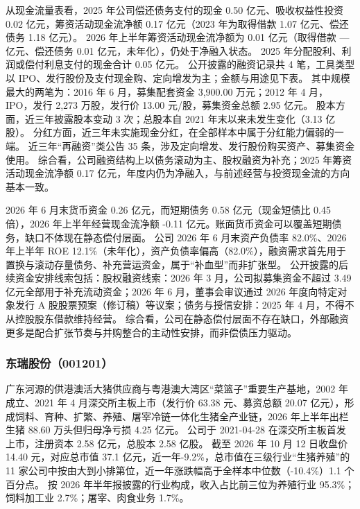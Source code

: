  从现金流量表看，2025 年公司偿还债务支付的现金 0.50 亿元、吸收权益性投资 0.02 亿元，筹资活动现金流净额 0.17 亿元（2023 年为取得借款 1.07 亿元、偿还债务 1.18 亿元）。 2026 年上半年筹资活动现金流净额为 0.01 亿元（取得借款 — 亿元、偿还债务 0.01 亿元，未年化），仍处于净融入状态。 2025 年分配股利、利润或偿付利息支付的现金合计 0.05 亿元。 公开披露的融资记录共 4 笔，工具类型以 IPO、发行股份及支付现金购、定向增发为主；金额与用途见下表。 其中规模最大的两笔为：2016 年 6 月，募集配套资金 3,900.00 万元；2012 年 4 月，IPO，发行 2,273 万股，发行价 13.00 元/股，募集资金总额 2.95 亿元。 股本方面，近三年披露股本变动 3 次；总股本自 2021 年末以来未发生变化（3.13 亿股）。 分红方面，近三年未实施现金分红，在全部样本中属于分红能力偏弱的一端。 近三年“再融资”类公告 35 条，涉及定向增发、发行股份购买资产、募集资金使用。 综合看，公司融资结构上以债务滚动为主、股权融资为补充；2025 年筹资活动现金流净额 0.17 亿元，年度内仍为净融入，与前述经营与投资现金流的方向基本一致。

 2026 年 6 月末货币资金 0.26 亿元，而短期债务 0.58 亿元（现金短债比 0.45 倍），2026 年上半年经营现金流净额 -0.11 亿元。账面货币资金可以覆盖短期债务，缺口不体现在静态偿付层面。 公司 2026 年 6 月末资产负债率 82.0\%、2026 年上半年 ROE 12.1\%（未年化），资产负债率偏高（82.0\%），融资需求首先用于置换与滚动存量债务、补充营运资金，属于“补血型”而非扩张型。 公开披露的后续资金安排线索包括：股权融资线索：2026 年 3 月，公司拟募集资金不超过 3.49 亿元全部用于补充流动资金；2026 年 6 月，董事会审议通过 2026 年度向特定对象发行 A 股股票预案（修订稿）等议案；债务与授信安排：2025 年 4 月，不得不从控股股东借款维持经营。 综合看，公司在静态偿付层面不存在缺口，外部融资更多是配合扩张节奏与并购整合的主动性安排，而非偿债压力驱动。




\subsubsection{东瑞股份（001201）}
\label{co:001201}

 广东河源的供港澳活大猪供应商与粤港澳大湾区“菜篮子”重要生产基地，2002 年成立、2021 年 4 月深交所主板上市（发行价 63.38 元、募资总额 20.07 亿元），形成饲料、育种、扩繁、养殖、屠宰冷链一体化生猪全产业链，2026 年上半年出栏生猪 88.60 万头但归母净亏损 4.25 亿元。 公司于 2021-04-28 在深交所主板首发上市，注册资本 2.58 亿元，总股本 2.58 亿股。 截至 2026 年 10 月 12 日收盘价 14.40 元，对应总市值 37.1 亿元，近一年-9.2\%，总市值在三级行业“生猪养殖”的 11 家公司中按由大到小排第位，近一年涨跌幅高于全样本中位数（-10.4\%）1.1 个百分点。 按 2026 年半年报披露的行业构成，收入占比前三位为养殖行业 95.3\%；饲料加工业 2.7\%；屠宰、肉食业务 1.7\%。

